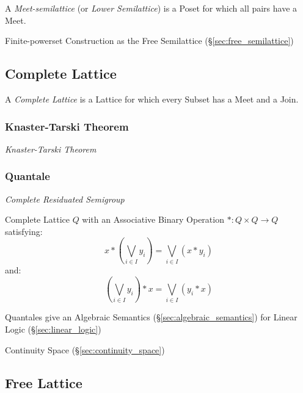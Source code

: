 A \emph{Meet-semilattice} (or \emph{Lower Semilattice}) is a Poset for
which all pairs have a Meet.

Finite-powerset Construction as the Free Semilattice
(\S\ref{sec:free_semilattice})



\subsection{Complete Lattice}\label{sec:complete_lattice}

A \emph{Complete Lattice} is a Lattice for which every Subset has a
Meet and a Join.



\subsubsection{Knaster-Tarski Theorem}\label{sec:knaster_tarski}

\emph{Knaster-Tarski Theorem}



\subsubsection{Quantale}\label{sec:quantale}

\emph{Complete Residuated Semigroup}

Complete Lattice $Q$ with an Associative Binary Operation $* : Q
\times Q \rightarrow Q$ satisfying:
\[
  x*(\bigvee_{i \in I} y_i) = \bigvee_{i \in I}(x * y_i)
\]
and:
\[
  (\bigvee_{i \in I} y_i)*x = \bigvee_{i \in I}(y_i * x)
\]

Quantales give an Algebraic Semantics
(\S\ref{sec:algebraic_semantics}) for Linear Logic
(\S\ref{sec:linear_logic})

Continuity Space (\S\ref{sec:continuity_space})



\subsection{Free Lattice}\label{sec:free_lattice}


